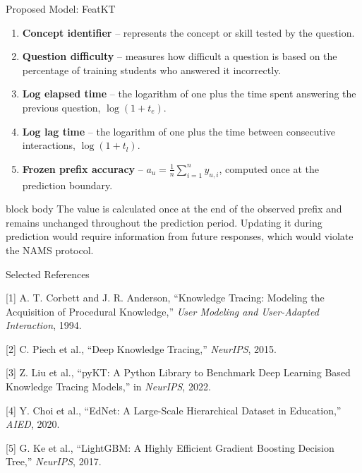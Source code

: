 \documentclass[final,xcolor={table}]{beamer}
\newcommand{\captionfont}{\fontsize{26}{31}\selectfont}
\newlength{\colwidth}
\begin{document}
\begin{frame}[t]
\begin{columns}[t]
\begin{column}{\colwidth}
\begin{block}{Proposed Model: FeatKT}
\begin{enumerate}\setlength{\itemsep}{0.35ex}
  \item \textbf{Concept identifier} -- represents the concept or skill
        tested by the question.
  \item \textbf{Question difficulty} -- measures how difficult a question
        is based on the percentage of training students who answered it
        incorrectly.
  \item \textbf{Log elapsed time} -- the logarithm of one plus the time
        spent answering the previous question, $\log(1+t_e)$.
  \item \textbf{Log lag time} -- the logarithm of one plus the time between
        consecutive interactions, $\log(1+t_l)$.
  \item \textbf{Frozen prefix accuracy} --
        $a_u=\frac{1}{n}\sum_{i=1}^{n}y_{u,i}$, computed once at the
        prediction boundary.
\end{enumerate}

\begin{beamercolorbox}[wd=\linewidth,sep=0.45cm]{block body}
\color{navy}The value is calculated once at the end of the observed prefix
and remains unchanged throughout the prediction period. Updating it during
prediction would require information from future responses, which would
violate the NAMS protocol.
\end{beamercolorbox}
\end{block}

\begin{block}{Selected References}
{\captionfont
\setlength{\parskip}{0.22ex}
\noindent\hangindent=1.15cm [1] A. T. Corbett and J. R. Anderson,
``Knowledge Tracing: Modeling the Acquisition of Procedural Knowledge,''
\emph{User Modeling and User-Adapted Interaction}, 1994.

\noindent\hangindent=1.15cm [2] C. Piech et al., ``Deep Knowledge
Tracing,'' \emph{NeurIPS}, 2015.

\noindent\hangindent=1.15cm [3] Z. Liu et al., ``pyKT: A Python Library to
Benchmark Deep Learning Based Knowledge Tracing Models,'' in
\emph{NeurIPS}, 2022.

\noindent\hangindent=1.15cm [4] Y. Choi et al., ``EdNet: A Large-Scale
Hierarchical Dataset in Education,'' \emph{AIED}, 2020.

\noindent\hangindent=1.15cm [5] G. Ke et al., ``LightGBM: A Highly
Efficient Gradient Boosting Decision Tree,'' \emph{NeurIPS}, 2017.
}
\end{block}


\end{column}
\end{columns}
\end{frame}
\end{document}
